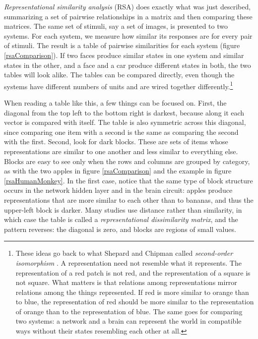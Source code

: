 \emph{Representational similarity analysis} (RSA) \cite{kriegeskorte2008representational} does exactly what was just described, summarizing a set of pairwise relationships in a matrix and then comparing these matrices. The same set of stimuli, say a set of images, is presented to two systems. For each system, we measure how similar its responses are for every pair of stimuli. The result is a table of pairwise similarities for each system (figure \ref{rsaComparison}). If two faces produce similar states in one system and similar states in the other, and a face and a car produce different states in both, the two tables will look alike. The tables can be compared directly, even though the systems have different numbers of units and are wired together differently.\footnote{These ideas go back to what Shepard and Chipman called \emph{second-order isomorphism} \cite{shepard1970second}. A representation need not resemble what it represents. The representation of a red patch is not red, and the representation of a square is not square. What matters is that relations among representations mirror relations among the things represented. If red is more similar to orange than to blue, the representation of red should be more similar to the representation of orange than to the representation of blue. The same goes for comparing two systems: a network and a brain can represent the world in compatible ways without their states resembling each other at all.}

When reading a table like this, a few things can be focused on. First, the diagonal from the top left to the bottom right is darkest, because along it each vector is compared with itself. The table is also symmetric across this diagonal, since comparing one item with a second is the same as comparing the second with the first. Second, look for dark blocks. These are sets of items whose representations are similar to one another and less similar to everything else. Blocks are easy to see only when the rows and columns are grouped by category, as with the two apples in figure \ref{rsaComparison} and the example in figure \ref{rsaHumanMonkey}. In the first case, notice that the same type of block structure occurs in the network hidden layer and in the brain circuit: apples produce representations that are more similar to each other than to bananas, and thus the upper-left block is darker. Many studies use distance rather than similarity, in which case the table is called a \emph{representational dissimilarity matrix}, and the pattern reverses: the diagonal is zero, and blocks are regions of small values. 

